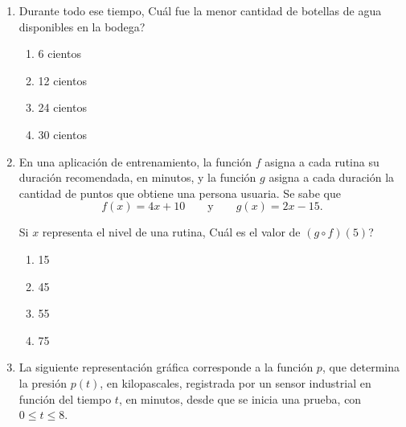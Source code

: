 \documentclass[12pt]{article}
\begin{document}
\begin{enumerate}[label=\textbf{\arabic*.}, itemsep=2.5cm]
\begin{enumerate}[label=\Alph*)]
  \item 15 cientos
  \item 18 cientos
  \item 24 cientos
  \item 28 cientos
\end{enumerate}

\item
Durante todo ese tiempo, \textquestiondown Cu\'al fue la menor cantidad de botellas de agua disponibles en la bodega?

\begin{enumerate}[label=\Alph*)]
  \item 6 cientos
  \item 12 cientos
  \item 24 cientos
  \item 30 cientos
\end{enumerate}

\Needspace{0.62\textheight}
\item
En una aplicaci\'on de entrenamiento, la funci\'on $f$ asigna a cada rutina su duraci\'on recomendada, en minutos, y la funci\'on $g$ asigna a cada duraci\'on la cantidad de puntos que obtiene una persona usuaria. Se sabe que
\[
f(x)=4x+10 \qquad \text{y} \qquad g(x)=2x-15.
\]

Si $x$ representa el nivel de una rutina, \textquestiondown Cu\'al es el valor de $(g\circ f)(5)$?

\begin{enumerate}[label=\Alph*)]
  \item 15
  \item 45
  \item 55
  \item 75
\end{enumerate}

\Needspace{0.95\textheight}
\item
La siguiente representaci\'on gr\'afica corresponde a la funci\'on $p$, que determina la presi\'on $p(t)$, en kilopascales, registrada por un sensor industrial en funci\'on del tiempo $t$, en minutos, desde que se inicia una prueba, con $0 \leq t \leq 8$.

\begin{center}
\end{center}


\end{enumerate}
\end{document}
